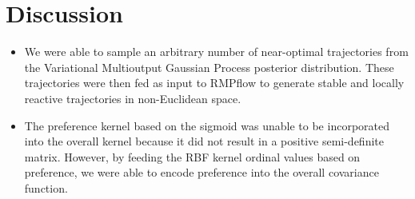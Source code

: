 \section{Discussion}
\begin{itemize}
    \item We were able to sample an arbitrary number of near-optimal trajectories from the Variational Multioutput Gaussian Process posterior distribution. These trajectories were then fed as input to RMPflow to generate stable and locally reactive trajectories in non-Euclidean space.
    
    \item The preference kernel based on the sigmoid was unable to be incorporated into the overall kernel because it did not result in a positive semi-definite matrix. However, by feeding the RBF kernel ordinal values based on preference, we were able to encode preference into the overall covariance function. 
\end{itemize}
